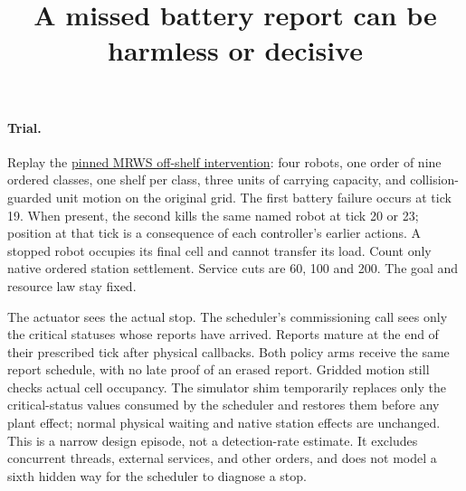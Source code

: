 \documentclass[11pt]{article}
\title{A missed battery report can be harmless or decisive}
\date{}
\begin{document}
\maketitle

\paragraph{Trial.}
Replay the \href{https://github.com/eternal-november/eos-research-programmes/pull/412}{pinned MRWS off-shelf intervention}: four robots, one order of nine ordered classes, one shelf per class, three units of carrying capacity, and collision-guarded unit motion on the original grid. The first battery failure occurs at tick 19. When present, the second kills the same named robot at tick 20 or 23; position at that tick is a consequence of each controller's earlier actions. A stopped robot occupies its final cell and cannot transfer its load. Count only native ordered station settlement. Service cuts are 60, 100 and 200. The goal and resource law stay fixed.

The actuator sees the actual stop. The scheduler's commissioning call sees only the critical statuses whose reports have arrived. Reports mature at the end of their prescribed tick after physical callbacks. Both policy arms receive the same report schedule, with no late proof of an erased report. Gridded motion still checks actual cell occupancy. The simulator shim temporarily replaces only the critical-status values consumed by the scheduler and restores them before any plant effect; normal physical waiting and native station effects are unchanged. This is a narrow design episode, not a detection-rate estimate. It excludes concurrent threads, external services, and other orders, and does not model a sixth hidden way for the scheduler to diagnose a stop.
\end{document}
